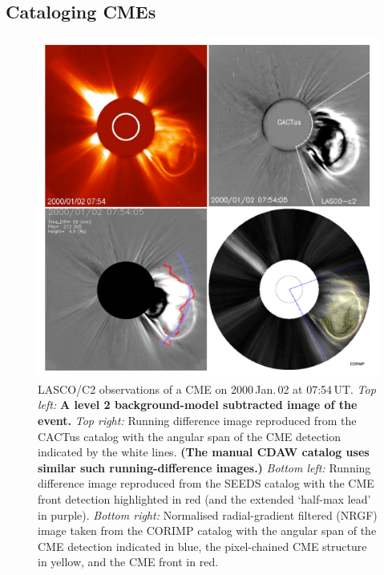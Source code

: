 \documentclass[referee,a4paper,12pt,traditabstract]{swsc}
\begin{document}
\begin{linenumbers}
\section{Cataloging CMEs}
\label{sect_catalogs}

\begin{figure}[!h]
\centerline{\includegraphics[width=\linewidth]{images/20000102_four.pdf}}
\caption{LASCO/C2 observations of a CME on 2000\,Jan.\,02 at 07:54\,UT. \emph{Top left:} {\bf A level 2 background-model subtracted image of the event.} \emph{Top right:} Running difference image reproduced from the CACTus catalog with the angular span of the CME detection indicated by the white lines. {\bf (The manual CDAW catalog uses similar such running-difference images.)} \emph{Bottom left:} Running difference image reproduced from the SEEDS catalog with the CME front detection highlighted in red (and the extended `half-max lead' in purple). \emph{Bottom right:} Normalised radial-gradient filtered (NRGF) image taken from the CORIMP catalog with the angular span of the CME detection indicated in blue, the pixel-chained CME structure in yellow, and the CME front in red.}
\label{20000102_four}
\end{figure}


\end{linenumbers}
\end{document}
